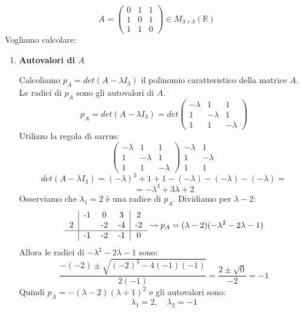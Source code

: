 \documentclass[a4paper]{article}
\theoremstyle{break}
\theoremstyle{break}
\theoremstyle{break}
\theoremstyle{break}
\begin{document}
\begin{example}
  \[
  A = \begin{pmatrix} 
    0 & 1 & 1\\
    1 & 0 & 1\\
    1 & 1 & 0
  \end{pmatrix} 
  \in M_{3 \times 3}(\mathbb{R})
  \] 
  Vogliamo calcolare:
  \begin{enumerate}
    \item \textbf{Autovalori di \( A \)}

      \vspace{1em}
      \noindent Calcoliamo \( p_A = det(A-\lambda I_3) \) il polinomio caratteristico
      della matrice \( A \). Le radici di \( p_A \) sono gli autovalori di \( A \).
      \[
      p_A = det(A - \lambda I_3) = det \begin{pmatrix} 
        -\lambda & 1 & 1\\
        1 & -\lambda & 1\\
        1 & 1 & -\lambda
      \end{pmatrix}
      \] 
      Utilizzo la regola di sarrus:
      \[
      \begin{pmatrix} 
        -\lambda & 1 & 1\\
        1 & -\lambda & 1\\
        1 & 1 & -\lambda
      \end{pmatrix} 
      \begin{matrix}
        -\lambda & 1\\
        1 & -\lambda\\
        1 & 1
      \end{matrix}
      \] 
      \[
      det(A - \lambda I_3) = (-\lambda)^3 + 1 + 1 - (-\lambda) - (-\lambda) - (-\lambda) =
      \] 
      \[
      = -\lambda^3 + 3\lambda + 2
      \] 
      Osserviamo che \( \lambda_1 = 2 \) è una radice di \( p_A \). Dividiamo per
      \( \lambda-2 \):
      \[
        \begin{tabular}{c|ccc|c}
          & -1 & 0 & 3 & 2 \\
          2 & & -2 & -4 & -2\\
          \hline
          & -1 & -2 & -1 & 0
      \end{tabular}
      \leadsto p_A = (\lambda-2)(-\lambda^2 - 2\lambda - 1)
      \] 
      Allora le radici di \( -\lambda^2 -2 \lambda - 1 \) sono:
      \[
      \frac{-(-2) \pm \sqrt{(-2)^2 - 4(-1)(-1)}}{2(-1)} = \frac{2 \pm \sqrt{0}}{-2} = -1
      \] 
      Quindi \( p_A = -(\lambda - 2)(\lambda + 1)^2 \) e gli autovalori sono:
      \[
      \lambda_1 = 2, \quad \lambda_2 = -1
      \] 


\end{enumerate}
\end{example}
\end{document}

